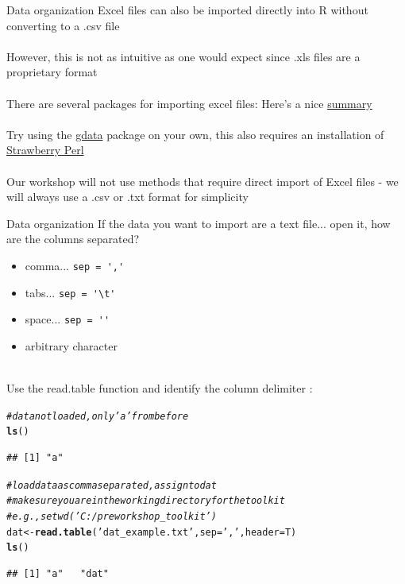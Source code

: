 \documentclass[xcolor=svgnames]{beamer}\usepackage[]{graphicx}\usepackage[]{color}
\makeatletter
\newcommand{\hlstr}[1]{\textcolor[rgb]{0.192,0.494,0.8}{#1}}%
\newcommand{\hlcom}[1]{\textcolor[rgb]{0.678,0.584,0.686}{\textit{#1}}}%
\newcommand{\hlstd}[1]{\textcolor[rgb]{0.345,0.345,0.345}{#1}}%
\newcommand{\hlkwb}[1]{\textcolor[rgb]{0.69,0.353,0.396}{#1}}%
\newcommand{\hlkwc}[1]{\textcolor[rgb]{0.333,0.667,0.333}{#1}}%
\newcommand{\hlkwd}[1]{\textcolor[rgb]{0.737,0.353,0.396}{\textbf{#1}}}%
\newenvironment{kframe}{%
 \def\at@end@of@kframe{}%
 \ifinner\ifhmode%
  \def\at@end@of@kframe{\end{minipage}}%
  \begin{minipage}{\columnwidth}%
 \fi\fi%
 \def\FrameCommand##1{\hskip\@totalleftmargin \hskip-\fboxsep
 \colorbox{shadecolor}{##1}\hskip-\fboxsep
     \hskip-\linewidth \hskip-\@totalleftmargin \hskip\columnwidth}%
 \MakeFramed {\advance\hsize-\width
   \@totalleftmargin\z@ \linewidth\hsize
   \@setminipage}}%
 {\par\unskip\endMakeFramed%
 \at@end@of@kframe}
\newenvironment{knitrout}{}{} %
\makeatother
\begin{document}
\begin{frame}{Data organization}
Excel files can also be imported directly into R without converting to a .csv file \\~\\
However, this is not as intuitive as one would expect since .xls files are a proprietary format \\~\\
There are several packages for importing excel files: Here's a nice \href{http://www.r-bloggers.com/a-million-ways-to-connect-r-and-excel/}{summary} \\~\\
Try using the \href{http://cran.r-project.org/web/packages/gdata/gdata.pdf}{gdata} package on your own, this also requires an installation of \href{http://strawberryperl.com/}{Strawberry Perl}\\~\\
Our workshop will not use methods that require direct import of Excel files - we will always use a .csv or .txt format for simplicity
\end{frame}

\begin{frame}{Data organization}
If the data you want to import are a text file... open it, how are the columns separated?
\begin{itemize}
\item comma... \verb!sep = ','!
\item tabs... \verb!sep = '\t'!
\item space... \verb!sep = ''!
\item arbitrary character\\~\\
\end{itemize}
Use the read.table function and identify the column delimiter :
\begin{knitrout}\scriptsize
{}\color{fgcolor}\begin{kframe}
\begin{alltt}
\hlcom{# data not loaded, only 'a' from before}
\hlkwd{ls}\hlstd{()}
\end{alltt}
\begin{verbatim}
## [1] "a"
\end{verbatim}
\begin{alltt}
\hlcom{# load data as comma separated, assign to dat}
\hlcom{# make sure you are in the working directory for the toolkit}
\hlcom{# e.g., setwd('C:/preworkshop_toolkit') }
\hlstd{dat} \hlkwb{<-} \hlkwd{read.table}\hlstd{(}\hlstr{'dat_example.txt'}\hlstd{,}\hlkwc{sep} \hlstd{=} \hlstr{','}\hlstd{,} \hlkwc{header} \hlstd{= T)}
\hlkwd{ls}\hlstd{()}
\end{alltt}
\begin{verbatim}
## [1] "a"   "dat"
\end{verbatim}
\end{kframe}
\end{knitrout}
\end{frame}
\end{document}

